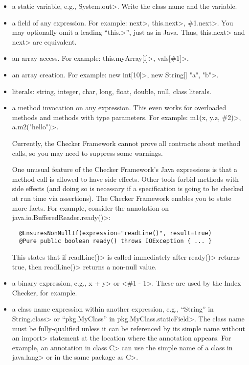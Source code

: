 \begin{itemize}
\item
  a static variable, e.g., \<System.out>.
  Write the class name and the variable.

\item
  a field of any expression.  For example:  \<next>,
  \<this.next>, \<\#1.next>. %
  You may optionally omit a leading ``\<this.>'', just as in Java.  Thus,
  \<this.next> and \<next> are equivalent.

\item
  an array access.  For example:  \<this.myArray[i]>, \<vals[\#1]>.

\item
  an array creation. For example: \<new int[10]>, \<new String[] {"a", "b"}>.

\item literals: string, integer, char, long, float, double, null, class literals.

\item a method invocation on any expression.
  This even works for overloaded methods and methods with type parameters.
  For example:
  \<m1(x, y.z, \#2)>, \<a.m2("hello")>.

  Currently, the Checker Framework cannot prove all contracts about method
  calls, so you may need to suppress some warnings.

  One unusual feature of the Checker Framework's Java expressions is that a
  method call is allowed to have side effects.  Other tools forbid methods
  with side effects (and doing so is necessary if a specification is going
  to be checked at run time via assertions).  The Checker Framework enables
  you to state more facts.  For example, consider the annotation on
  \<java.io.BufferedReader.ready()>:

\begin{Verbatim}
  @EnsuresNonNullIf(expression="readLine()", result=true)
  @Pure public boolean ready() throws IOException { ... }
\end{Verbatim}

  This states that if \<readLine()> is called immediately after \<ready()>
  returns true, then \<readLine()> returns a non-null value.

\item a binary expression, e.g., \<x + y> or <\#1 - 1>.  These are used by
  the Index Checker, for example.

\item a class name expression within another expression, e.g., ``String''
  in \<String.class> or ``pkg.MyClass'' in \<pkg.MyClass.staticField>.  The
  class name must be fully-qualified unless it can be referenced by its
  simple name without an \<import> statement at the location where the
  annotation appears.  For example, an annotation in class \<C> can use the
  simple name of a class in \<java.lang> or in the same package as \<C>.

\end{itemize}

